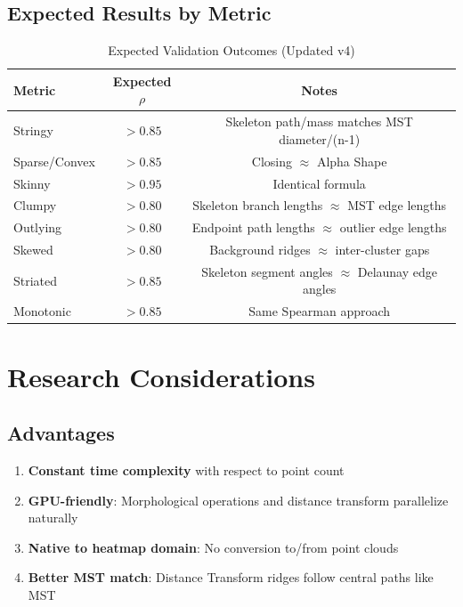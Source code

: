 \documentclass[11pt]{article}
\begin{document}
\subsection{Expected Results by Metric}

\begin{table}[h]
\centering
\caption{Expected Validation Outcomes (Updated v4)}
\begin{tabular}{@{}lcc@{}}
\toprule
\textbf{Metric} & \textbf{Expected $\rho$} & \textbf{Notes} \\
\midrule
Stringy & $> 0.85$ & Skeleton path/mass matches MST diameter/(n-1) \\
Sparse/Convex & $> 0.85$ & Closing $\approx$ Alpha Shape \\
Skinny & $> 0.95$ & Identical formula \\
Clumpy & $> 0.80$ & Skeleton branch lengths $\approx$ MST edge lengths \\
Outlying & $> 0.80$ & Endpoint path lengths $\approx$ outlier edge lengths \\
Skewed & $> 0.80$ & Background ridges $\approx$ inter-cluster gaps \\
Striated & $> 0.85$ & Skeleton segment angles $\approx$ Delaunay edge angles \\
Monotonic & $> 0.85$ & Same Spearman approach \\
\bottomrule
\end{tabular}
\end{table}

\section{Research Considerations}

\subsection{Advantages}
\begin{enumerate}
    \item \textbf{Constant time complexity} with respect to point count
    \item \textbf{GPU-friendly}: Morphological operations and distance transform parallelize naturally
    \item \textbf{Native to heatmap domain}: No conversion to/from point clouds
    \item \textbf{Better MST match}: Distance Transform ridges follow central paths like MST
\end{enumerate}
\end{document}
